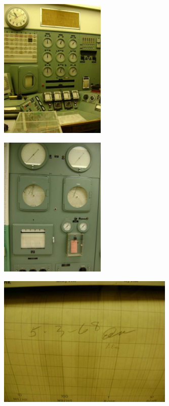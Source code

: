\documentclass[aspectratio=1610,pdftex,dvipsnames,compress,xcolor={dvipsnames}]{beamer}
\begin{document}
\begin{frame}{}
    \begin{figure}
        \centering
        \includegraphics[width=0.45\textwidth]{hb13.jpg}
    \end{figure}
\end{frame}


\begin{frame}{}
    \begin{figure}
        \centering
        \includegraphics[width=0.45\textwidth]{hb14.jpg}
    \end{figure}
\end{frame}


\begin{frame}{}
    \begin{figure}
        \centering
        \includegraphics[width=0.75\textwidth]{hb15.jpg}
    \end{figure}
\end{frame}
\end{document}
